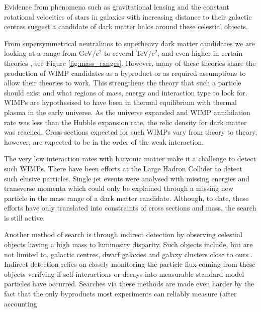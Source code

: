 \documentclass[11pt]{article} %
\begin{document}
Evidence from phenomena such as gravitational lensing \cite{wittman2000detection} and the constant rotational velocities of stars in galaxies with increasing
distance to their galactic centres \cite{oort1932force} suggest a candidate of dark matter halos around these celestial objects.
\\
\par From supersymmetrical neutralinos to superheavy dark matter candidates we are looking at a range from GeV/$c^2$ to
 several TeV/$c^2$, and even higher in certain theories \cite{roszkowski2004particle}, see Figure \ref{fig:mass_ranges}.
However, many of these theories share the production of WIMP candidates as a byproduct or as required assumptions
to allow their theories to work.
This strengthens the theory that such a particle should exist and what regions of mass, energy and interaction type to look for.
WIMPs are hypothesised to have been in thermal equilibrium with thermal plasma in the early universe.
As the universe expanded and WIMP annihilation rate was less than the Hubble expansion rate, the relic density for dark matter was reached.
Cross-sections expected for such WIMPs vary from theory to theory, however, are expected to be in the order of the weak interaction.
\\
\par The very low interaction rates with baryonic matter make it a challenge to detect such WIMPs.
There have been efforts at the Large Hadron Collider \cite{aad2013search} \cite{chatrchyan2012search}
to detect such elusive particles.
Single jet events were analysed with missing energies and transverse momenta which could only be
explained through a missing new particle in the mass range of a dark matter candidate.
Although, to date, these efforts have only translated into constraints of cross sections and mass, the search is still active.
\\
\par Another method of search is through indirect detection \cite{gaskins2016review} by observing celestial objects having a high mass to luminosity disparity.
Such objects include, but are not limited to, galactic centres, dwarf galaxies and galaxy clusters close to ours \cite{harvey2015nongravitational}.
Indirect detection relies on closely monitoring the particle flux coming from these objects verifying if self-interactions or decays into measurable standard model particles have occurred.
Searches via these methods are made even harder by the fact that the only byproducts most experiments can reliably measure (after accounting
\end{document}
